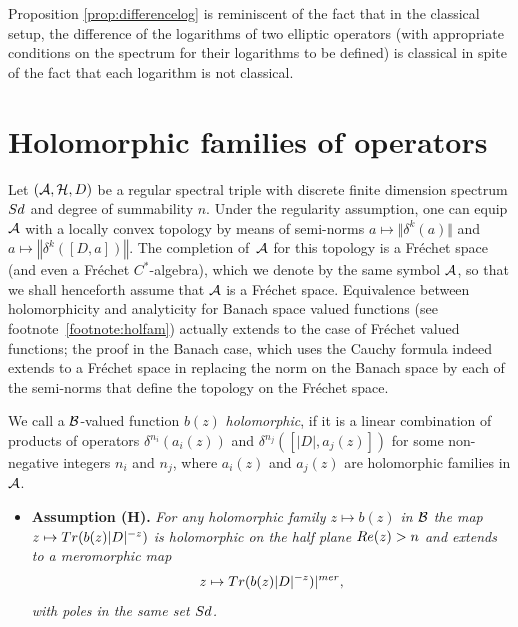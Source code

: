 \documentclass[11pt]{article}
\numberwithin{equation}{section}
\begin{document}
\begin{remark}
Proposition \ref{prop:differencelog}  is reminiscent of   the  fact that in the classical setup,
  the dif\/ference of the logarithms of two elliptic operators
  (with appropriate conditions on the spectrum for their
   logarithms to be def\/ined) is classical in spite of the fact that each
    logarithm is not classical.\end{remark}


\section{Holomorphic families of operators}\label{section4}

 Let  $\left({\cal A}, {\cal H}, D\right)$ be a regular spectral triple  with
 discrete f\/inite dimension spectrum ${\rm Sd}$ and deg\-ree of summability $n$.
 Under the regularity assumption, one can equip ${\cal A}$ with a locally convex topology by means of semi-norms $a\mapsto \Vert \delta^k(a)\Vert$ and $a\mapsto \left \Vert \delta^k\left( [D, a]\right)\right\Vert$. The completion of~${\cal A}$ for this topology is a  Fr\'echet space~\cite{V} (and even a Fr\'echet $C^*$-algebra), which we denote by the same symbol ${\cal A}$, so that we shall henceforth assume that ${\cal A}$ is a Fr\'echet space.   Equivalence between
 holomorphicity and analyticity for   Banach space valued functions (see footnote~\ref{footnote:holfam})  actually extends to the case of Fr\'echet valued functions; the proof in the Banach case, which uses the Cauchy formula indeed extends to a Fr\'echet space in replacing the norm
  on the Banach space by each of the  semi-norms
  that def\/ine the topology on the Fr\'echet space.

   We call a ${\cal B}$-valued function $b(z)$
{\it holomorphic}, if it is a linear combination of products of  operators
$ \delta^{n_i}(a_i(z))$ and $\delta^{n_j}([\vert D\vert, a_j(z)])$
 for  some non-negative integers $n_i$ and $n_j$, where  $a_i(z)$
 and $a_j(z)$ are holomorphic families in ${\cal A}$.
 \begin{itemize}\itemsep=0pt
\item {\bf Assumption (H).}  {\it For any holomorphic family  $z\mapsto b(z)$ in ${\cal B}$
the  map $ z\mapsto {\rm Tr}(b(z) \vert D\vert^{-z})$
is holomorphic on the  half plane ${\rm Re}(z)>n$ and
 extends to a meromorphic map
 \begin{gather}
 \label{eq:TRz}
  z\mapsto {\rm Tr}(b(z) \vert D\vert^{-z})\vert^{\rm mer},
 \end{gather}
with  poles   in the same  set ${\rm Sd}$.}
\end{itemize}
\end{document}
